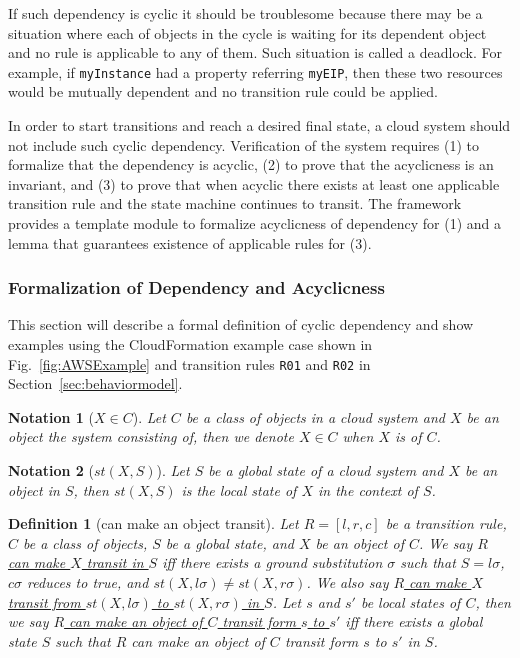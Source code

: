 \documentclass[12pt]{report}
\newtheorem{notation}{Notation}
\newtheorem{definition}{Definition}
\newcommand{\ul}{\underline}
\begin{document}
If such dependency is cyclic it should be troublesome because there
may be a situation where each of objects in the cycle is waiting for
its dependent object and no rule is applicable to any of them. Such
situation is called a deadlock.  For example, if {\tt myInstance} had
a property referring {\tt myEIP}, then these two resources would be
mutually dependent and no transition rule could be applied.

In order to start transitions and reach a desired final state, a cloud
system should not include such cyclic dependency. Verification of the
system requires (1) to formalize that the dependency is acyclic, (2)
to prove that the acyclicness is an invariant, and (3) to prove that
when acyclic there exists at least one applicable transition rule and the
state machine continues to transit. The framework provides a template module
to formalize acyclicness of dependency for (1) and a lemma that
guarantees existence of applicable rules for (3).

\subsubsection{Formalization of Dependency and Acyclicness}
This section will describe a formal definition of cyclic dependency
and show examples using the CloudFormation example case shown in
Fig.~\ref{fig:AWSExample} and transition rules {\tt R01} and {\tt R02}
in Section~\ref{sec:behaviormodel}.

\begin{notation}[$X \in C$]
Let $C$ be a class of objects in a cloud system and $X$ be an object
the system consisting of, then we denote \ul{$X \in C$} when $X$ is of
$C$.
\end{notation}

\begin{notation}[$st(X,S)$]
Let $S$ be a global state of a cloud system and $X$ be an object in
$S$, then \ul{$st(X,S)$} is the local state of $X$ in the context of
$S$.
\end{notation}

\begin{definition}[can make an object transit]
Let $R = [l,r,c]$ be a transition rule, $C$ be a class of objects, $S$
be a global state, and $X$ be an object of $C$. We say \ul{$R$ can
  make $X$ transit in $S$} iff there exists a ground substitution
$\sigma$ such that $S = l\sigma$, $c\sigma$ reduces to true, and
$st(X,l\sigma) \ne st(X,r\sigma)$. We also say \ul{$R$ can make $X$
  transit from $st(X,l\sigma)$ to $st(X,r\sigma)$ in $S$}.  Let $s$
and $s'$ be local states of $C$, then we say \ul{$R$ can make an object
  of $C$ transit form $s$ to $s'$} iff there exists a global state $S$
such that $R$ can make an object of $C$ transit form $s$ to $s'$ in $S$.
\end{definition}
\end{document}
